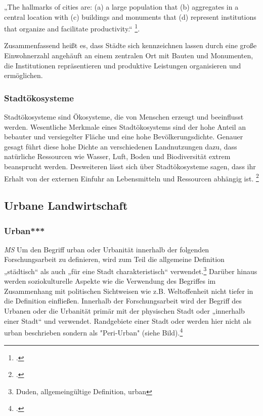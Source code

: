 \documentclass{scrartcl}
\begin{document}
\begin{displayquote} 
„The hallmarks of cities are: (a) a large population that (b) aggregates in a central location with (c) buildings and monuments that (d) represent institutions that organize and facilitate productivity.“ \footcite[S.16]{Elmqvist2013}. 
\end{displayquote}  Zusammenfassend heißt es, dass Städte sich kennzeichnen lassen durch eine große Einwohnerzahl angehäuft an einem zentralen Ort mit Bauten und Monumenten, die Institutionen repräsentieren und produktive Leistungen organisieren und ermöglichen.

\subsubsection{Stadtökosysteme}
Stadtökosysteme sind Ökosysteme, die von Menschen erzeugt und beeinflusst werden. Wesentliche Merkmale eines Stadtökosystems sind der hohe Anteil an bebauter und versiegelter Fläche und eine hohe Bevölkerungsdichte. Genauer gesagt führt diese hohe Dichte an verschiedenen Landnutzungen dazu, dass natürliche Ressourcen wie Wasser, Luft, Boden und Biodiversität extrem beansprucht werden. Desweiteren lässt sich über Stadtökosysteme sagen, dass ihr Erhalt von der externen Einfuhr an Lebensmitteln und Ressourcen abhängig ist.  \footcite[S.61]{Breuste2016Stadtokosysteme}


\subsection{Urbane Landwirtschaft}

\subsubsection{Urban***}\textit{MS}
Um den Begriff urban oder Urbanität innerhalb der folgenden Forschungsarbeit zu definieren, wird zum Teil die allgemeine Definition „städtisch“ als auch „für eine Stadt charakteristisch“ verwendet.\footnote{Duden, allgemeingültige Definition, urban} Darüber hinaus werden soziokulturelle Aspekte wie die Verwendung des Begriffes im Zusammenhang mit politischen Sichtweisen wie z.B. Weltoffenheit nicht tiefer in die Definition einfließen. Innerhalb der Forschungsarbeit wird der Begriff des Urbanen oder die Urbanität primär mit der physischen Stadt oder „innerhalb einer Stadt“ und verwendet. Randgebiete einer Stadt oder werden hier nicht als urban beschrieben sondern als "Peri-Urban" (siehe Bild).\footcite[S. 140]{MullerUrbanStadt}
\end{document}
